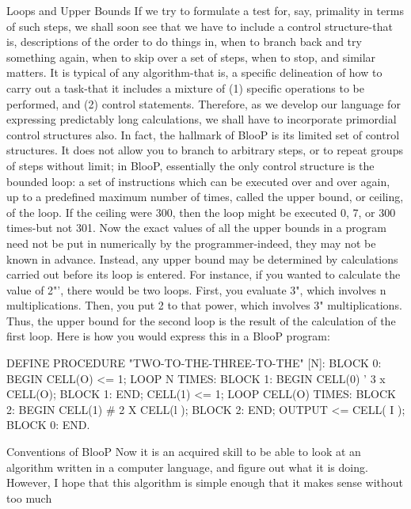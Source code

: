                               Loops and Upper Bounds
If we try to formulate a test for, say, primality in terms of such steps, we shall soon see
that we have to include a control structure-that is, descriptions of the order to do things
in, when to branch back and try something again, when to skip over a set of steps, when
to stop, and similar matters.
It is typical of any algorithm-that is, a specific delineation of how to carry out a task-that
it includes a mixture of (1) specific operations to be performed, and (2) control
statements. Therefore, as we develop our language for expressing predictably long
calculations, we shall have to incorporate primordial control structures also. In fact, the
hallmark of BlooP is its limited set of control structures. It does not allow you to branch
to arbitrary steps, or to repeat groups of steps without limit; in BlooP, essentially the only
control structure is the bounded loop: a set of instructions which can be executed over
and over again, up to a predefined maximum number of times, called the upper bound, or
ceiling, of the loop. If the ceiling were 300, then the loop might be executed 0, 7, or 300
times-but not 301.
Now the exact values of all the upper bounds in a program need not be put in numerically
by the programmer-indeed, they may not be known in advance. Instead, any upper bound
may be determined by calculations carried out before its loop is entered. For instance, if
you wanted to calculate the value of 2"', there would be two loops. First, you evaluate 3",
which involves n multiplications. Then, you put 2 to that power, which involves 3"
multiplications. Thus, the upper bound for the second loop is the result of the calculation
of the first loop.
       Here is how you would express this in a BlooP program:

      DEFINE PROCEDURE "TWO-TO-THE-THREE-TO-THE" [N]:
      BLOCK 0: BEGIN
                 CELL(O) <= 1;
                 LOOP N TIMES:
                 BLOCK 1: BEGIN
                               CELL(0) ' 3 x CELL(O);
                 BLOCK 1: END;
                 CELL(1) <= 1;
                 LOOP CELL(O) TIMES:
                 BLOCK 2: BEGIN
                               CELL(1) \# 2 X CELL(l );
                BLOCK 2: END;
                OUTPUT <= CELL( I );
       BLOCK 0: END.

                                Conventions of BlooP
Now it is an acquired skill to be able to look at an algorithm written in a computer
language, and figure out what it is doing. However, I hope that this algorithm is simple
enough that it makes sense without too much



